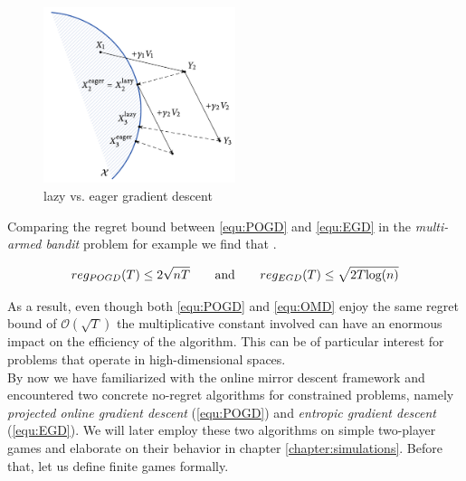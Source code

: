 \begin{figure}[H]
\centering
  \includegraphics[width=0.5\textwidth]{logos/LazyVsEager.png}
\caption{lazy vs. eager gradient descent}
\label{fig:LazyVsEager}
\end{figure}

Comparing the regret bound between \ref{equ:POGD} and \ref{equ:EGD} in the \textit{multi-armed bandit} problem for example we find that \cite{HDRmertikopoulos}. 

\begin{equation*}
    reg_{POGD}(T) \le 2\sqrt{nT} \qquad \textnormal{and} \qquad reg_{EGD}(T) \le \sqrt{2T\textnormal{log}(n)}
\end{equation*}

As a result, even though both \ref{equ:POGD} and \ref{equ:OMD} enjoy the same regret bound of $\mathcal{O}(\sqrt{T})$ the multiplicative constant involved can have an enormous impact on the efficiency of the algorithm. This can be of particular interest for problems that operate in high-dimensional spaces. \\

By now we have familiarized with the online mirror descent framework and encountered two concrete no-regret algorithms for constrained problems, namely \textit{projected online gradient descent} (\ref{equ:POGD}) and \textit{entropic gradient descent} (\ref{equ:EGD}). We will later employ these two algorithms on simple two-player games and elaborate on their behavior in chapter \ref{chapter:simulations}. Before that, let us define finite games formally. 


